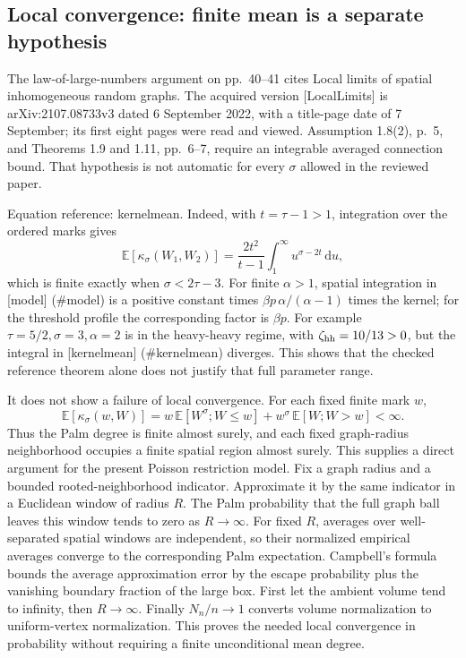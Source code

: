 \documentclass[10pt]{article}
\begin{document}
\subsection*{Local convergence: finite mean is a separate hypothesis}
The law-of-large-numbers argument on pp. 40–41 cites Local limits of spatial inhomogeneous random graphs. The acquired version [LocalLimits] is arXiv:2107.08733v3 dated 6 September 2022, with a title-page date of 7 September; its first eight pages were read and viewed. Assumption 1.8(2), p. 5, and Theorems 1.9 and 1.11, pp. 6–7, require an integrable averaged connection bound. That hypothesis is not automatic for every \(\sigma\) allowed in the reviewed paper.\par
Equation reference: kernelmean. Indeed, with \(t=\tau-1>1\), integration over the ordered marks gives \[
 \mathbb E[\kappa_\sigma(W_1,W_2)]
  =\frac{2t^2}{t-1}\int_1^\infty u^{\sigma-2t}\,\mathrm du,\] which is finite exactly when \(\sigma<2\tau-3\). For finite \(\alpha>1\), spatial integration in [model] (\#model) is a positive constant times \(\beta p\,\alpha/(\alpha-1)\) times the kernel; for the threshold profile the corresponding factor is \(\beta p\). For example \(\tau=5/2,\sigma=3,\alpha=2\) is in the heavy-heavy regime, with \(\zeta_{\rm hh}=10/13>0\), but the integral in [kernelmean] (\#kernelmean) diverges. This shows that the checked reference theorem alone does not justify that full parameter range.\par
It does not show a failure of local convergence. For each fixed finite mark \(w\), \[\mathbb E[\kappa_\sigma(w,W)]
 =w\,\mathbb E[W^\sigma;W\leq w]
  +w^\sigma\,\mathbb E[W;W>w]<\infty.\] Thus the Palm degree is finite almost surely, and each fixed graph-radius neighborhood occupies a finite spatial region almost surely. This supplies a direct argument for the present Poisson restriction model. Fix a graph radius and a bounded rooted-neighborhood indicator. Approximate it by the same indicator in a Euclidean window of radius \(R\). The Palm probability that the full graph ball leaves this window tends to zero as \(R\to\infty\). For fixed \(R\), averages over well-separated spatial windows are independent, so their normalized empirical averages converge to the corresponding Palm expectation. Campbell’s formula bounds the average approximation error by the escape probability plus the vanishing boundary fraction of the large box. First let the ambient volume tend to infinity, then \(R\to\infty\). Finally \(N_n/n\to1\) converts volume normalization to uniform-vertex normalization. This proves the needed local convergence in probability without requiring a finite unconditional mean degree.\par
\end{document}
